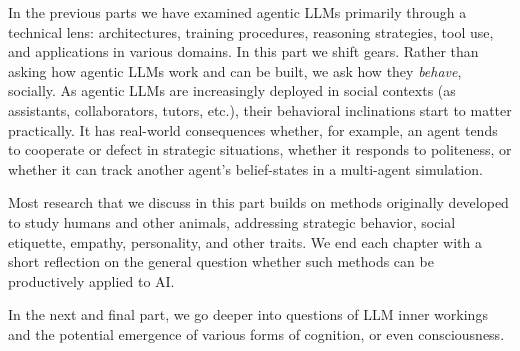 In the previous parts we have examined agentic LLMs primarily through a technical lens: architectures, training procedures, reasoning strategies, tool use, and applications in various domains. In this part we shift gears. Rather than asking how agentic LLMs work and can be built, we ask how they \emph{behave}, socially. %
As agentic LLMs are increasingly deployed in social contexts (as assistants, collaborators, tutors, etc.), their behavioral inclinations start to matter practically. It has real-world consequences whether, for example, an agent tends to cooperate or defect in strategic situations, whether it responds to politeness, or whether it can track another agent's belief-states in a multi-agent simulation. 

Most research that we discuss in this part builds on methods originally developed to study humans and other animals, addressing strategic behavior, social etiquette, empathy, personality, and other traits. We end each chapter with a short reflection on the general question whether such methods can be productively applied to AI. 

In the next and final part, we go deeper into questions of LLM inner workings and the potential emergence of various forms of cognition, or even consciousness.
